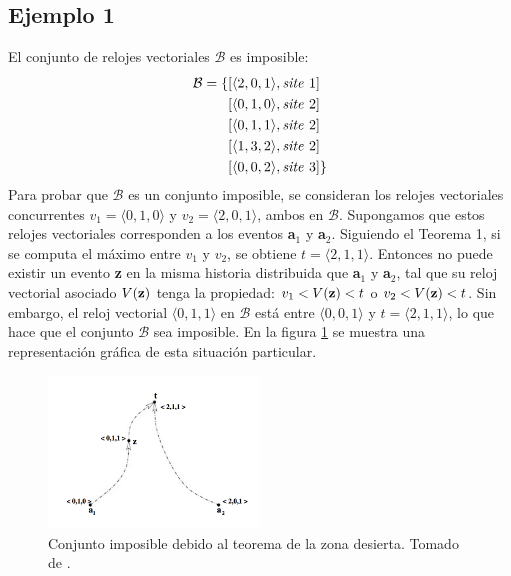 \documentclass[12pt, times]{simauth}
\begin{document}
\subsection{Ejemplo 1}
El conjunto de relojes vectoriales $\mathcal{B}$ es imposible:
\begin{align*}
\mathcal{B} = \{ & [\langle 2,0,1 \rangle, \text{\emph{site }} 1] \\
                  & [\langle 0,1,0 \rangle, \text{\emph{site }} 2] \\  
                  & [\langle 0,1,1 \rangle, \text{\emph{site }} 2] \\
                  & [\langle 1,3,2 \rangle, \text{\emph{site }} 2] \\
                  & [\langle 0,0,2 \rangle, \text{\emph{site }} 3] \} 
\end{align*}
Para probar que $\mathcal{B}$ es un conjunto imposible, se consideran los relojes vectoriales concurrentes $v_1 = \langle 0,1,0 \rangle$ y $v_2 = \langle 2,0,1 \rangle$, ambos en $\mathcal{B}$. Supongamos que estos relojes vectoriales corresponden a los eventos \textbf{a}$_1$ y \textbf{a}$_2$. Siguiendo el Teorema 1, si se computa el máximo entre $v_1$ y $v_2$, se obtiene $t = \langle 2,1,1 \rangle$. Entonces no puede existir un evento \textbf{z} en la misma historia distribuida que \textbf{a}$_1$ y \textbf{a}$_2$, tal que su reloj vectorial asociado $V(\text{\textbf{z}})$ tenga la propiedad: $v_1 < V(\text{\textbf{z}}) < t$ o $v_2 < V(\text{\textbf{z}}) < t$. Sin embargo, el reloj vectorial $\langle 0,1,1 \rangle$ en $\mathcal{B}$ está entre $\langle 0,0,1 \rangle$ y $t = \langle 2,1,1 \rangle$, lo que hace que el conjunto $\mathcal{B}$ sea imposible. En la figura \ref{fig:imposible1} se muestra una representación gráfica de esta situación particular.

\begin{figure}[h]
\centering
\includegraphics[width=0.5\textwidth]{conjunto-imposible-1}
\caption{Conjunto imposible debido al teorema de la zona desierta. Tomado de \cite{meneses}.}
\label{fig:imposible1}
\end{figure}
\end{document}
